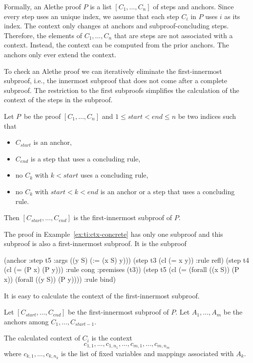 \documentclass{scrartcl}
\begin{document}
Formally, an Alethe proof $P$ is a list $[C_1, \dots, C_n]$ of steps
and anchors.
Since every step uses an unique index, we assume that each step
$C_i$ in $P$ uses $i$ as its index.
The context
only changes at anchors and subproof-concluding steps.
Therefore, the elements of $C_1, \dots, C_n$ that are steps
are not associated with a context.
Instead, the context can be computed
from the prior anchors.
The anchors only ever extend the context.

To check an Alethe proof we can iteratively eliminate the first-innermost
subproof, i.e., the innermost subproof that does not come after a
complete subproof.  The restriction to the first subproofs simplifies
the calculation of the context of the steps in the subproof.

\begin{definition}
  Let $P$\, be the proof $[C_1, \dots, C_n]$ and $1 \leq \mathit{start}
  < \mathit{end} \leq n$ be two indices such that
  \begin{itemize}
    \item $C_{\mathit{start}}$ is an anchor,
    \item $C_{\mathit{end}}$ is a step that uses a concluding rule,
    \item no $C_k$ with $k < \mathit{start}$ uses a concluding rule,
    \item no $C_k$ with $\mathit{start} < k < \mathit{end}$ is an anchor or
     a step that uses a concluding rule.
  \end{itemize}
  Then $[C_{\mathit{start}}, \dots, C_{\mathit{end}}]$ is the
  first-innermost subproof of $P$.
\end{definition}

\begin{example}
The proof in Example~\ref{ex:ti:ctx-concrete} has only one subproof
and this subproof is also a first-innermost subproof.  It is the subproof
\begin{AletheVerb}
(anchor :step t5 :args ((y S) (:= (x S) y)))
(step t3 (cl (= x y)) :rule refl)
(step t4 (cl (= (P x) (P y))) :rule cong :premises (t3))
(step t5 (cl (= (forall ((x S)) (P x)) (forall ((y S)) (P y))))
                              :rule bind)
\end{AletheVerb}
\end{example}

\noindent
It is easy to calculate the context of the first-innermost subproof.

\begin{definition}
  Let $[C_{\mathit{start}}, \dots, C_{\mathit{end}}]$ be
  the first-innermost subproof of $P$.
  Let $A_1, \dots, A_m$ be the anchors among $C_1, \dots, C_{\mathit{start}-1}$.

  The calculated context of $C_i$ is the context
  \[
  c_{1,1}, \dots, c_{1, n_1}, \dots, c_{m,1}, \dots, c_{m, n_m}
  \]
  where $c_{k,1}, \dots, c_{k, n_k}$ is the list of fixed variables
  and mappings associated with $A_k$.
\end{definition}
\end{document}
